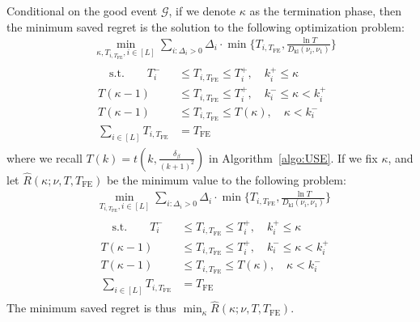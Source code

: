 \documentclass[twoside,11pt]{article}
\newcommand{\kl}{D_{\mathrm{kl}}}
\newcommand{\calG}{\mathcal{G}}
\newcommand{\Tfe}{T_{\mathrm{FE}}}
\begin{document}
Conditional on the good event $\calG$, if we denote $\kappa$ as the termination phase,
then the minimum saved regret is the solution to the following optimization problem:
\begin{align}
    &\min_{\kappa,T_{i,\Tfe},i\in[L]} \sum_{i:\Delta_i>0} \Delta_i\cdot\min\bigg\{T_{i,\Tfe},\frac{\ln T}{\kl(\nu_i,\nu_1)}\bigg\}
    \\
    &
    \begin{aligned}
        \quad \mbox{s.t.} \qquad
        T_i^- &\leq T_{i,\Tfe} \leq T_i^+,\quad k_i^+\leq \kappa
    \\
        T(\kappa-1) &\leq T_{i,\Tfe} \leq T_i^+,\quad k_i^-\leq \kappa<k_i^+
    \\
         T(\kappa-1) &\leq T_{i,\Tfe}\leq T(\kappa),\quad  \kappa < k_i^-
    \\
        \sum_{i\in[L]} T_{i,\Tfe} &=\Tfe
    \end{aligned}
\end{align}
where we recall $T(k)= t(k,\frac{\delta_\beta}{(k+1)^2})$ in Algorithm~\ref{algo:USE}.
If we fix $\kappa$, and let $\hat{R}(\kappa;\nu,T,\Tfe)$ be the minimum value to the following problem:
\begin{align}
    &\min_{T_{i,\Tfe},i\in[L]} \sum_{i:\Delta_i>0} \Delta_i\cdot\min\bigg\{T_{i,\Tfe},\frac{\ln T}{\kl(\nu_i,\nu_1)}\bigg\}
    \\
    &
    \begin{aligned}
        \quad \mbox{s.t.} \qquad
        T_i^- &\leq T_{i,\Tfe} \leq T_i^+,\quad k_i^+\leq \kappa
    \\
        T(\kappa-1) &\leq T_{i,\Tfe} \leq T_i^+,\quad k_i^-\leq \kappa<k_i^+
    \\
         T(\kappa-1) &\leq T_{i,\Tfe}\leq T(\kappa),\quad  \kappa < k_i^-
    \\
        \sum_{i\in[L]} T_{i,\Tfe} &=\Tfe
    \end{aligned}
\end{align}
The minimum saved regret is thus
$ 
    \min_\kappa \hat{R}(\kappa;\nu,T,\Tfe).
$
\end{document}
